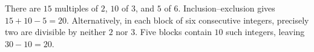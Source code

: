 There are $15$ multiples of $2$, $10$ of $3$, and $5$ of $6$. Inclusion--exclusion gives $15+10-5=\boxed{20}$. Alternatively, in each block of six consecutive integers, precisely two are divisible by neither $2$ nor $3$. Five blocks contain $10$ such integers, leaving $30-10=20$.
